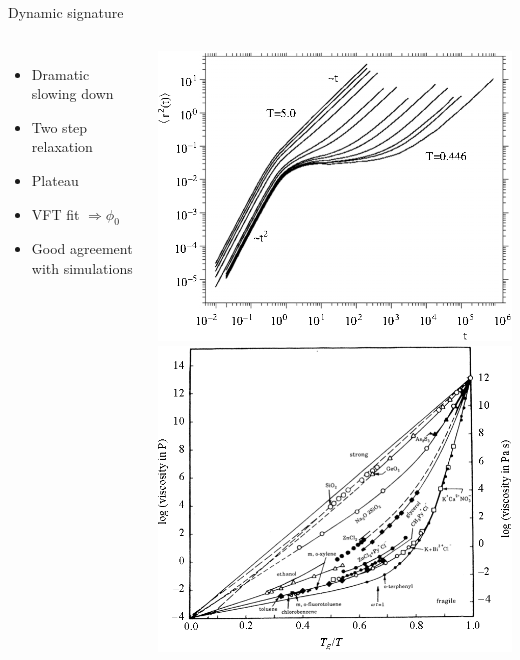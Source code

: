 \begin{frame}{Dynamic signature}
	\begin{columns}[T]
		{\resizebox{\textwidth}{!}{\begin{Large}\end{Large}}}%
	\begin{itemize}
		\item Dramatic slowing down
		\item Two step relaxation
		\item Plateau
		\item VFT fit $\Rightarrow\phi_0$
		\item<4> Good agreement with simulations
	\end{itemize}
	{\includegraphics[width=\columnwidth, height=0.7\columnwidth]{msd_kob}}\\
	\alt<4>{\resizebox{\textwidth}{!}{\begin{Large}\end{Large}}}%
		{\includegraphics[width=\columnwidth, height=0.7\columnwidth]{angell}}
	\end{columns}
\end{frame}

